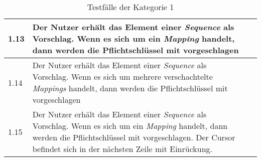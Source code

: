 \begin{table}[htp]
\begin{tabularx}{\columnwidth}{lXl}
    \midrule
    1.13                                                                  & Der Nutzer erhält das Element einer \textit{Sequence} als Vorschlag. Wenn es sich um ein \textit{Mapping} handelt, dann werden die Pflichtschlüssel mit vorgeschlagen                                                                 &                                           \\
    \midrule
    1.14                                                                  & Der Nutzer erhält das Element einer \textit{Sequence} als Vorschlag. Wenn es sich um mehrere verschachtelte \textit{Mappings} handelt, dann werden die Pflichtschlüssel mit vorgeschlagen                                             &                                           \\
    \midrule
    1.15                                                                  & Der Nutzer erhält das Element einer \textit{Sequence} als Vorschlag. Wenn es sich um ein \textit{Mapping} handelt, dann werden die Pflichtschlüssel mit vorgeschlagen. Der Cursor befindet sich in der nächsten Zeile mit Einrückung. &                                           \\
    \bottomrule
  \end{tabularx}
  \caption{Testfälle der Kategorie 1}
  \label{tbl:evaluation-test-cases-category-1}
\end{table}



